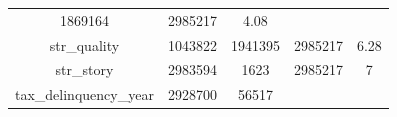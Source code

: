 \documentclass[]{book}
\theoremstyle{definition}
\theoremstyle{definition}
\theoremstyle{definition}
\theoremstyle{remark}
\begin{document}
\begin{longtable}[]{@{}ccccc@{}}
\begin{minipage}[t]{0.13\columnwidth}
1869164\strut
\end{minipage} & \begin{minipage}[t]{0.12\columnwidth}\centering\strut
2985217\strut
\end{minipage} & \begin{minipage}[t]{0.12\columnwidth}\centering\strut
4.08\strut
\end{minipage}\tabularnewline
\begin{minipage}[t]{0.35\columnwidth}\centering\strut
str\_quality\strut
\end{minipage} & \begin{minipage}[t]{0.12\columnwidth}\centering\strut
1043822\strut
\end{minipage} & \begin{minipage}[t]{0.13\columnwidth}\centering\strut
1941395\strut
\end{minipage} & \begin{minipage}[t]{0.12\columnwidth}\centering\strut
2985217\strut
\end{minipage} & \begin{minipage}[t]{0.12\columnwidth}\centering\strut
6.28\strut
\end{minipage}\tabularnewline
\begin{minipage}[t]{0.35\columnwidth}\centering\strut
str\_story\strut
\end{minipage} & \begin{minipage}[t]{0.12\columnwidth}\centering\strut
2983594\strut
\end{minipage} & \begin{minipage}[t]{0.13\columnwidth}\centering\strut
1623\strut
\end{minipage} & \begin{minipage}[t]{0.12\columnwidth}\centering\strut
2985217\strut
\end{minipage} & \begin{minipage}[t]{0.12\columnwidth}\centering\strut
7\strut
\end{minipage}\tabularnewline
\begin{minipage}[t]{0.35\columnwidth}\centering\strut
tax\_delinquency\_year\strut
\end{minipage} & \begin{minipage}[t]{0.12\columnwidth}\centering\strut
2928700\strut
\end{minipage} & \begin{minipage}[t]{0.13\columnwidth}\centering\strut
56517\strut
\end{minipage} & \begin{minipage}[t]{0.12\columnwidth}\centering\strut

\end{minipage}
\end{longtable}
\end{document}
